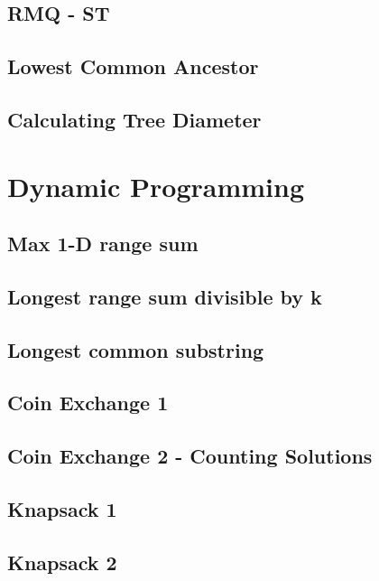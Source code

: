 	\subsection{RMQ - ST}
	\subsection{Lowest Common Ancestor}
	\subsection{Calculating Tree Diameter}


\section{Dynamic Programming}
	\subsection{Max 1-D range sum}
	\subsection{Longest range sum divisible by k}
	\subsection{Longest common substring}
	\subsection{Coin Exchange 1}
	\subsection{Coin Exchange 2 - Counting Solutions}
	\subsection{Knapsack 1}
	\subsection{Knapsack 2}
